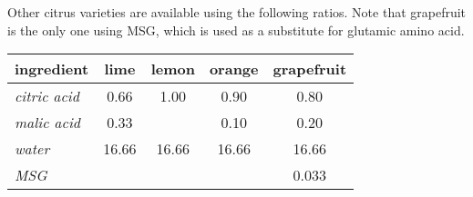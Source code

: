 \begin{variation}
\item Other citrus varieties are available using the following ratios\cite{superJuiceKosGrapefruit}\cite{superJuiceKos}.
	Note that grapefruit is the only one using \acrshort{MSG}, which is used as a substitute for glutamic amino acid\cite{superJuiceKosGrapefruitYT}.
	\begin{center}
		\begin{tabular}{lSSSS}\toprule
			\textbf{ingredient}     &  \textbf{lime} & \textbf{lemon} & \textbf{orange} & \textbf{grapefruit} \\ \midrule
			\textit{citric acid}    &           0.66 &           1.00 &            0.90 &                0.80 \\
			\textit{malic acid}     &           0.33 &                &            0.10 &                0.20 \\
			\textit{water}          &          16.66 &          16.66 &           16.66 &               16.66 \\
			\textit{\acrshort{MSG}} &                &                &                 &               0.033 \\ \bottomrule
	\end{tabular}
	\end{center}
\end{variation}


\recipeend%
